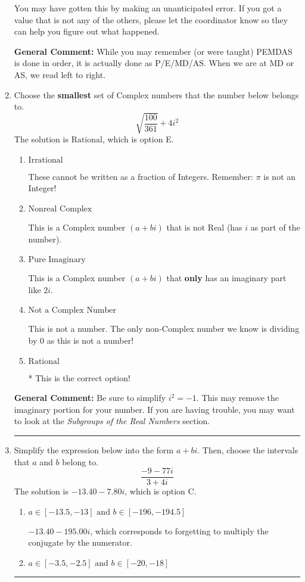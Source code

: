 \documentclass{extbook}[14pt]
\newcommand{\litem}[1]{\item #1

\rule{\textwidth}{0.4pt}}
\begin{document}
\begin{enumerate}
{\begin{enumerate}[label=\Alph*.]
 You may have gotten this by making an unanticipated error. If you got a value that is not any of the others, please let the coordinator know so they can help you figure out what happened.
\end{enumerate}

\textbf{General Comment:} While you may remember (or were taught) PEMDAS is done in order, it is actually done as P/E/MD/AS. When we are at MD or AS, we read left to right.
}
\litem{
Choose the \textbf{smallest} set of Complex numbers that the number below belongs to.
\[ \sqrt{\frac{100}{361}} + 4i^2 \]The solution is \( \text{Rational} \), which is option E.\begin{enumerate}[label=\Alph*.]
\item \( \text{Irrational} \)

These cannot be written as a fraction of Integers. Remember: $\pi$ is not an Integer!
\item \( \text{Nonreal Complex} \)

This is a Complex number $(a+bi)$ that is not Real (has $i$ as part of the number).
\item \( \text{Pure Imaginary} \)

This is a Complex number $(a+bi)$ that \textbf{only} has an imaginary part like $2i$.
\item \( \text{Not a Complex Number} \)

This is not a number. The only non-Complex number we know is dividing by 0 as this is not a number!
\item \( \text{Rational} \)

* This is the correct option!
\end{enumerate}

\textbf{General Comment:} Be sure to simplify $i^2 = -1$. This may remove the imaginary portion for your number. If you are having trouble, you may want to look at the \textit{Subgroups of the Real Numbers} section.
}
\litem{
Simplify the expression below into the form $a+bi$. Then, choose the intervals that $a$ and $b$ belong to.
\[ \frac{-9 - 77 i}{3 + 4 i} \]The solution is \( -13.40  - 7.80 i \), which is option C.\begin{enumerate}[label=\Alph*.]
\item \( a \in [-13.5, -13] \text{ and } b \in [-196, -194.5] \)

 $-13.40  - 195.00 i$, which corresponds to forgetting to multiply the conjugate by the numerator.
\item \( a \in [-3.5, -2.5] \text{ and } b \in [-20, -18] \)


\end{enumerate}}
\end{enumerate}
\end{document}
